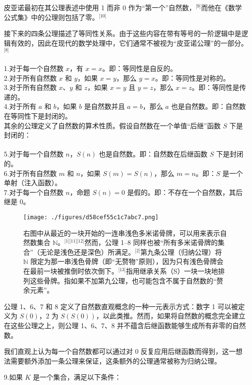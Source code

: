 皮亚诺最初在其公理表述中使用 1 而非 0 作为“第一个”自然数，\(^\text{[9]}\)而他在《数学公式集》中的公理则包括了零。\(^\text{[10]}\)

接下来的四条公理描述了等同性关系。由于这些内容在带有等号的一阶逻辑中是逻辑有效的，因此在现代的数学处理中，它们通常不被视为“皮亚诺公理”的一部分。\(^\text{[8]}\)\\\\
1.对于每一个自然数 $x$，有 $x = x$。即：等同性是自反的。\\
2.对于所有自然数 $x$ 和 $y$，如果 $x = y$，那么 $y = x$。即：等同性是对称的。\\
3.对于所有自然数 $x$、$y$ 和 $z$，如果 $x = y$ 且 $y = z$，那么 $x = z$。即：等同性是传递的。\\
4.对于所有 $a$ 和 $b$，如果 $b$ 是自然数并且 $a = b$，那么 $a$ 也是自然数。即：自然数在等同性下是封闭的。\\

其余的公理定义了自然数的算术性质。假设自然数在一个单值“后继”函数 $S$ 下是封闭的：\\\\
5.对于每一个自然数 $n$，$S(n)$ 也是自然数。即：自然数在后继函数 $S$ 下是封闭的。\\
6.对于所有自然数 $m$ 和 $n$，如果 $S(m) = S(n)$，那么 $m = n$。即：$S$ 是一个单射（注入函数）。\\
7.对于每一个自然数 $n$，命题 $S(n) = 0$ 是假的。即：不存在一个自然数，其后继是 0。
\begin{figure}[ht]
\centering
\texttt{[image: ./figures/d58cef55c1c7abc7.png]}
\caption{右图中从最近的一块开始的一连串浅色多米诺骨牌，可以用来表示自然数集合 $\mathbb{N}$。\(^\text{[1][11][12]}\)然而，公理 1–8 同样也被“所有多米诺骨牌的集合”（无论是浅色还是深色）所满足。\(^\text{[2]}\)第九条公理（归纳公理）将 $\mathbb{N}$ 限定为那一串浅色骨牌（即“无赘物”原则），因为只有浅色骨牌会在最前一块被推倒时依次倒下。\(^\text{[13]}\)指用继承关系（S）一块一块地排列这些骨牌。指如果不加第九公理，也可能包含不属于自然数的“赘余元素”。} \label{fig_PYN_1}
\end{figure}
公理 1、6、7 和 8 定义了自然数直观概念的一种一元表示方式：数字 1 可以被定义为 $S(0)$，2 为 $S(S(0))$，以此类推。然而，如果将自然数的概念完全建立在这些公理之上，则公理 1、6、7、8 并不蕴含后继函数能够生成所有非零的自然数。

我们直观上认为每一个自然数都可以通过对 0 反复应用后继函数而得到，这一想法需要额外添加一条公理来保证，这条额外的公理通常被称为归纳公理。

9.如果 $K$ 是一个集合，满足以下条件：

